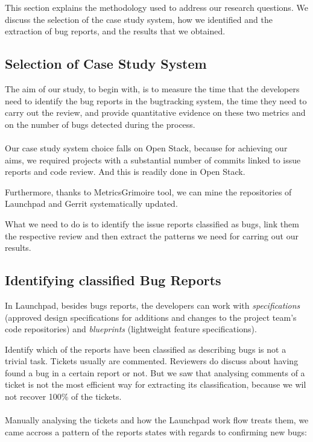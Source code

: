 \documentclass[ifip]{svmult}
\begin{document}
This section explains the methodology used to address our research questions.  
We discuss the selection of the case study system, how we identified and the extraction of 
bug reports, and the results that we obtained.


\subsection{Selection of Case Study System}
The aim of our study, to begin with, is to measure the time that the developers need to identify 
the bug reports in the bugtracking system, 
the time they need to carry out the review, and provide quantitative evidence on these two metrics and
on the number of bugs detected during the process. 
\\
\\
Our case study system choice falls on Open Stack, because for achieving our aims, we required projects with a
substantial number of commits linked to issue reports and code review. And this is 
readily done in Open Stack.

Furthermore, thanks to MetricsGrimoire tool, we can mine the repositories of Launchpad and Gerrit systematically updated.

What we need to do is to identify the issue reports classified as bugs, link them the respective review and then 
extract the patterns we need for carring out our results.

\subsection{Identifying classified Bug Reports}
\label{sec:4.1}

In Launchpad, besides bugs reports, the developers can work with \textit{specifications} 
(approved design specifications for additions and changes to the project team’s code repositories) 
and \textit{blueprints} (lightweight feature specifications).

Identify which of the reports have been classified as describing bugs is not a trivial task.
Tickets usually are commented. Reviewers do discuss about having found a bug in a certain report or not. 
But we saw that analysing comments of a ticket is not the most efficient way for extracting its classification, 
because we wil not recover 100\% of the tickets.
\\
\\
Manually analysing the tickets and how the Launchpad work flow treats them, we came accross a pattern 
of the reports states with regards to confirming new bugs:
\end{document}
